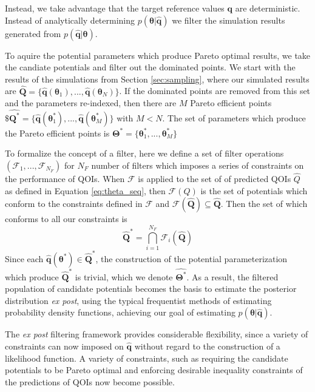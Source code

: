 Instead, we take advantage that the target reference values $\bm{q}$ are deterministic.  Instead of analytically determining $p(\bm{\theta}|\hat{\bm{q}})$ we filter the simulation results generated from $p(\hat{\bm{q}}|\bm{\theta})$.

To aquire the potential parameters which produce Pareto optimal results, we take the candiate potentials and filter out the dominated points.  We start with the results of the simulations from Section \ref{sec:sampling}, where our simulated results are $\hat{\bm{Q}}= \{\hat{\bm{q}}(\bm{\theta}_1),...,\hat{\bm{q}}(\bm{\theta}_N)\}$.
 If the dominated points are removed from this set and the parameters re-indexed, then there are $M$ Pareto efficient points
 $\$\hat{\bm{Q}^*}
  = \{\hat{\bm{q}}(\bm{\theta}_1^*)
	  ,...
		,\hat{\bm{q}}(\bm{\theta}_M^*)\}$
  with $M < N$.  The set of parameters which produce the Pareto efficient points is
	$\bm{\Theta}^*=\{\bm{\theta}_1^*,...,\bm{\theta}_M^*\}$

To formalize the concept of a filter, here we define a set of filter operations $(\mathcal{F}_1,...,\mathcal{F}_{N_F})$ for $N_F$ number of filters which imposes a series of constraints on the performance of QOIs.  When $\mathcal{F}$ is applied to the set of of predicted QOIs $\hat{Q}$ as defined in Equation \ref{eq:theta_seq}, then $\mathcal{F}(Q)$ is the set of potentials which conform to the constraints defined in $\mathcal{F}$ and $\mathcal{F}(\hat{\bm{Q}}) \subseteq \hat{\bm{Q}}$.
Then the set of which conforms to all our constraints is
\begin{equation}
  \hat{\bm{Q}}^*
	=
	\bigcap_{i=1}^{N_F} \mathcal{F}_i(\hat{\bm{Q}})
\end{equation}
Since each  $\hat{\bm{q}}(\bm{\theta}^*) \in \hat{\bm{Q}}^*$, the construction of the potential parameterization which produce $\hat{\bm{Q}}^*$ is trivial, which we denote  $\hat{\bm{\Theta}^*}$.
As a result, the filtered population of candidate potentials becomes the basis to estimate the posterior distribution \emph{ex post}, using the typical frequentist methods of estimating probability density functions, achieving our goal of estimating $p(\bm{\theta}|\hat{\bm{q}})$.

The \emph{ex post} filtering framework provides considerable flexibility, since a variety of constraints can now imposed on $\hat{\bm{q}}$ without regard to the construction of a likelihood function.
A variety of constraints, such as requiring the candidate potentials to be Pareto optimal and enforcing desirable inequality constraints of the predictions of QOIs now become possible.

